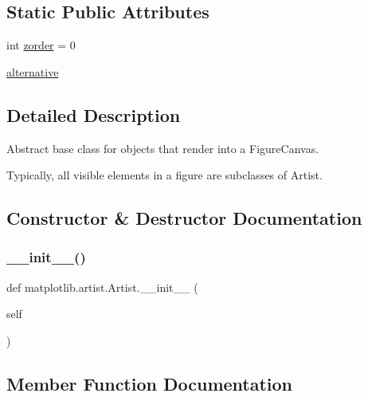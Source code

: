 \subsection*{Static Public Attributes}
\begin{DoxyCompactItemize}
\item 
int \hyperlink{classmatplotlib_1_1artist_1_1Artist_a210781a1646a5f1e9a1a82bf488c314f}{zorder} = 0
\item 
\hyperlink{classmatplotlib_1_1artist_1_1Artist_a7212e5da981d4c0c7a0d752bbd55a542}{alternative}
\end{DoxyCompactItemize}


\subsection{Detailed Description}
\begin{DoxyVerb}Abstract base class for objects that render into a FigureCanvas.

Typically, all visible elements in a figure are subclasses of Artist.
\end{DoxyVerb}
 

\subsection{Constructor \& Destructor Documentation}
\mbox{\label{classmatplotlib_1_1artist_1_1Artist_a08b09d4b2ca8065bbd3632e8fc370d12}} 
\subsubsection{\texorpdfstring{\+\_\+\+\_\+init\+\_\+\+\_\+()}{\_\_init\_\_()}}
{\footnotesize\ttfamily def matplotlib.\+artist.\+Artist.\+\_\+\+\_\+init\+\_\+\+\_\+ (\begin{DoxyParamCaption}\item[{}]{self }\end{DoxyParamCaption})}



\subsection{Member Function Documentation}
\mbox{\label{classmatplotlib_1_1artist_1_1Artist_ac571a37a5d90b332a5836c9bfcd9df4d}} 
